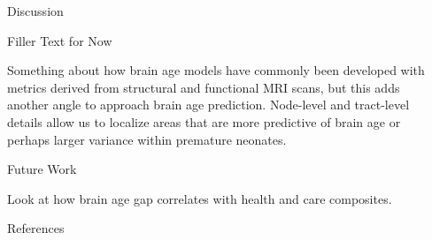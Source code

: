 \documentclass[final]{beamer}
\newlength{\sepwidth}
\newlength{\colwidth}
\newcommand{\separatorcolumn}{\begin{column}{\sepwidth}\end{column}}
\begin{document}
\begin{frame}[t]
\begin{columns}[t]
\begin{column}{\colwidth}
\begin{block}{Discussion}
  \end{block}

  \begin{block}{Filler Text for Now}

    Something about how brain age models have commonly been developed with metrics derived from structural and functional MRI scans, but this adds another angle to approach brain age prediction. Node-level and tract-level details allow us to localize areas that are more predictive of brain age or perhaps larger variance within premature neonates.

  \end{block}

  \begin{block}{Future Work}

    Look at how brain age gap correlates with health and care composites.

  \end{block}

  \begin{block}{References}

    \nocite{*}
    \renewcommand{\bibfont}{\scriptsize} %
    \printbibliography

  \end{block}


\end{column}

\separatorcolumn
\end{columns}
\end{frame}
\end{document}
